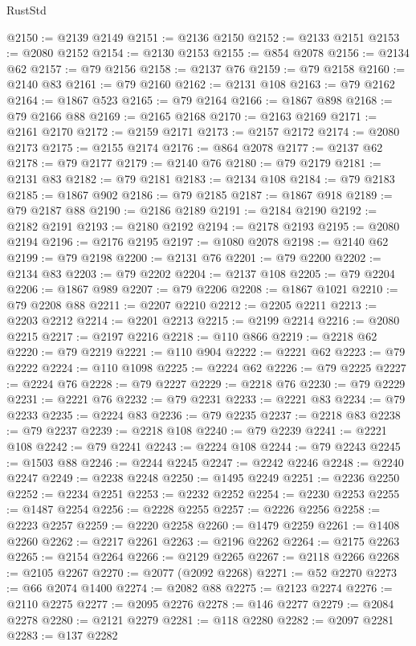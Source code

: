 \begin{lexlean}{RustStd}
\begin{coremodule}
@2150 := @2139 @2149
@2151 := @2136 @2150
@2152 := @2133 @2151
@2153 := @2080 @2152
@2154 := @2130 @2153
@2155 := @854 @2078
@2156 := @2134 @62
@2157 := @79 @2156
@2158 := @2137 @76
@2159 := @79 @2158
@2160 := @2140 @83
@2161 := @79 @2160
@2162 := @2131 @108
@2163 := @79 @2162
@2164 := @1867 @523
@2165 := @79 @2164
@2166 := @1867 @898
@2168 := @79 @2166 @88
@2169 := @2165 @2168
@2170 := @2163 @2169
@2171 := @2161 @2170
@2172 := @2159 @2171
@2173 := @2157 @2172
@2174 := @2080 @2173
@2175 := @2155 @2174
@2176 := @864 @2078
@2177 := @2137 @62
@2178 := @79 @2177
@2179 := @2140 @76
@2180 := @79 @2179
@2181 := @2131 @83
@2182 := @79 @2181
@2183 := @2134 @108
@2184 := @79 @2183
@2185 := @1867 @902
@2186 := @79 @2185
@2187 := @1867 @918
@2189 := @79 @2187 @88
@2190 := @2186 @2189
@2191 := @2184 @2190
@2192 := @2182 @2191
@2193 := @2180 @2192
@2194 := @2178 @2193
@2195 := @2080 @2194
@2196 := @2176 @2195
@2197 := @1080 @2078
@2198 := @2140 @62
@2199 := @79 @2198
@2200 := @2131 @76
@2201 := @79 @2200
@2202 := @2134 @83
@2203 := @79 @2202
@2204 := @2137 @108
@2205 := @79 @2204
@2206 := @1867 @989
@2207 := @79 @2206
@2208 := @1867 @1021
@2210 := @79 @2208 @88
@2211 := @2207 @2210
@2212 := @2205 @2211
@2213 := @2203 @2212
@2214 := @2201 @2213
@2215 := @2199 @2214
@2216 := @2080 @2215
@2217 := @2197 @2216
@2218 := @110 @866
@2219 := @2218 @62
@2220 := @79 @2219
@2221 := @110 @904
@2222 := @2221 @62
@2223 := @79 @2222
@2224 := @110 @1098
@2225 := @2224 @62
@2226 := @79 @2225
@2227 := @2224 @76
@2228 := @79 @2227
@2229 := @2218 @76
@2230 := @79 @2229
@2231 := @2221 @76
@2232 := @79 @2231
@2233 := @2221 @83
@2234 := @79 @2233
@2235 := @2224 @83
@2236 := @79 @2235
@2237 := @2218 @83
@2238 := @79 @2237
@2239 := @2218 @108
@2240 := @79 @2239
@2241 := @2221 @108
@2242 := @79 @2241
@2243 := @2224 @108
@2244 := @79 @2243
@2245 := @1503 @88
@2246 := @2244 @2245
@2247 := @2242 @2246
@2248 := @2240 @2247
@2249 := @2238 @2248
@2250 := @1495 @2249
@2251 := @2236 @2250
@2252 := @2234 @2251
@2253 := @2232 @2252
@2254 := @2230 @2253
@2255 := @1487 @2254
@2256 := @2228 @2255
@2257 := @2226 @2256
@2258 := @2223 @2257
@2259 := @2220 @2258
@2260 := @1479 @2259
@2261 := @1408 @2260
@2262 := @2217 @2261
@2263 := @2196 @2262
@2264 := @2175 @2263
@2265 := @2154 @2264
@2266 := @2129 @2265
@2267 := @2118 @2266
@2268 := @2105 @2267
@2270 := @2077 (@2092 @2268)
@2271 := @52 @2270
@2273 := @66 @2074 @1400
@2274 := @2082 @88
@2275 := @2123 @2274
@2276 := @2110 @2275
@2277 := @2095 @2276
@2278 := @146 @2277
@2279 := @2084 @2278
@2280 := @2121 @2279
@2281 := @118 @2280
@2282 := @2097 @2281
@2283 := @137 @2282

\end{coremodule}
\end{lexlean}
